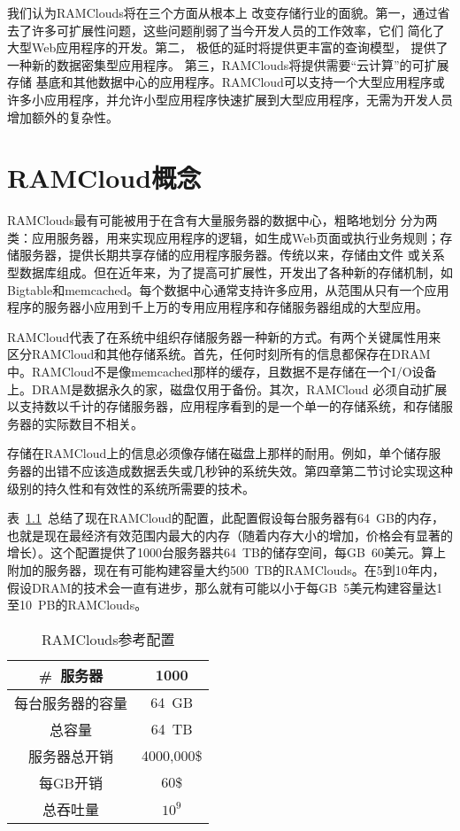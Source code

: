 \documentclass[translation]{zjutreport}
\begin{document}
我们认为RAMClouds将在三个方面从根本上
改变存储行业的面貌。第一，通过省去了许多可扩展性问题，这些问题削弱了当今开发人员的工作效率，它们
简化了大型Web应用程序的开发。第二，
极低的延时将提供更丰富的查询模型，
提供了一种新的数据密集型应用程序。
第三，RAMClouds将提供需要“云计算”的可扩展存储
基底和其他数据中心的应用程序。RAMCloud可以支持一个大型应用程序或许多小应用程序，并允许小型应用程序快速扩展到大型应用程序，无需为开发人员增加额外的复杂性。


\chapter{RAMCloud概念}
RAMClouds最有可能被用于在含有大量服务器的数据中心，粗略地划分
分为两类：应用服务器，用来实现应用程序的逻辑，如生成Web页面或执行业务规则；存储服务器，提供长期共享存储的应用程序服务器。传统以来，存储由文件
或关系型数据库组成。但在近年来，为了提高可扩展性，开发出了各种新的存储机制，如Bigtable和memcached。每个数据中心通常支持许多应用，从范围从只有一个应用程序的服务器小应用到千上万的专用应用程序和存储服务器组成的大型应用。

RAMCloud代表了在系统中组织存储服务器一种新的方式。有两个关键属性用来区分RAMCloud和其他存储系统。首先，任何时刻所有的信息都保存在DRAM中。RAMCloud不是像memcached那样的缓存，且数据不是存储在一个I/O设备上。DRAM是数据永久的家，磁盘仅用于备份。其次，RAMCloud
必须自动扩展以支持数以千计的存储服务器，应用程序看到的是一个单一的存储系统，和存储服务器的实际数目不相关。

存储在RAMCloud上的信息必须像存储在磁盘上那样的耐用。例如，单个储存服务器的出错不应该造成数据丢失或几秒钟的系统失效。第四章第二节讨论实现这种级别的持久性和有效性的系统所需要的技术。

表~\ref{tab:table1}~总结了现在RAMCloud的配置，此配置假设每台服务器有64~GB的内存，也就是现在最经济有效范围内最大的内存（随着内存大小的增加，价格会有显著的增长）。这个配置提供了1000台服务器共64~TB的储存空间，每GB~60美元。算上附加的服务器，现在有可能构建容量大约500~TB的RAMClouds。在5到10年内，假设DRAM的技术会一直有进步，那么就有可能以小于每GB~5美元构建容量达1至10~PB的RAMClouds。

\begin{table}[htbp]
\caption{RAMClouds参考配置}\label{tab:table1}
\vspace{0.5em}
\begin{center}
{\wuhao
\begin{tabular}{cc}
\toprule[1.5pt]
\#~服务器 & 1000\\
\midrule[1pt]
每台服务器的容量 & 64~GB \\
总容量 & 64~TB \\
服务器总开销 & 4000,000\$ \\
每GB开销 & 60\$ \\
总吞吐量 & $10^{9}$ \\
\bottomrule[1.5pt]
\end{tabular}}
\end{center}
\vspace{\baselineskip}
\end{table}
\end{document}
